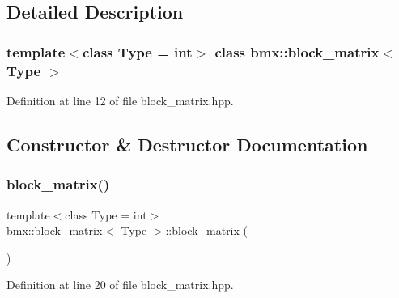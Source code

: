 \subsection{Detailed Description}
\subsubsection*{template$<$class Type = int$>$\newline
class bmx\+::block\+\_\+matrix$<$ Type $>$}



Definition at line 12 of file block\+\_\+matrix.\+hpp.



\subsection{Constructor \& Destructor Documentation}
\mbox{\label{classbmx_1_1block__matrix_a04826c7a53ad8da87b0e9eede8af679a}} 
\subsubsection{\texorpdfstring{block\+\_\+matrix()}{block\_matrix()}\hspace{0.1cm}{\footnotesize\ttfamily [1/2]}}
{\footnotesize\ttfamily template$<$class Type = int$>$ \\
\mbox{\hyperlink{classbmx_1_1block__matrix}{bmx\+::block\+\_\+matrix}}$<$ Type $>$\+::\mbox{\hyperlink{classbmx_1_1block__matrix}{block\+\_\+matrix}} (\begin{DoxyParamCaption}{ }\end{DoxyParamCaption})\hspace{0.3cm}{\ttfamily [inline]}}



Definition at line 20 of file block\+\_\+matrix.\+hpp.

\mbox{\label{classbmx_1_1block__matrix_a8356cfaa8cc00082ec82070f4143b6fa}} 
